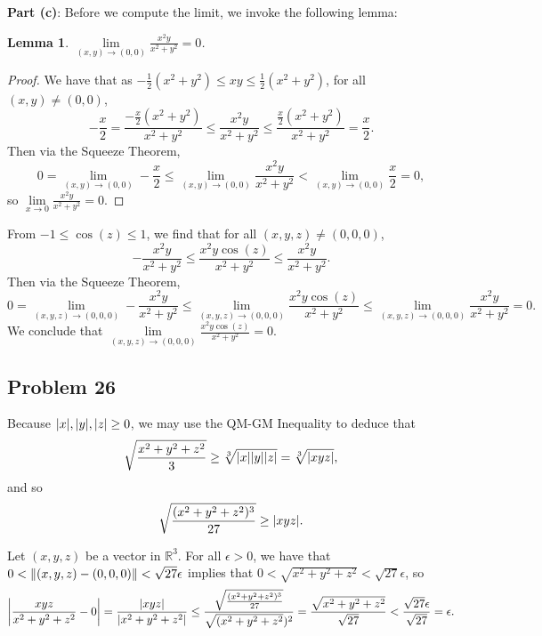 \documentclass[11pt]{article}
\newtheorem*{lemma*}{Lemma}
\begin{document}
\textbf{Part (c)}: Before we compute the limit, we invoke the following lemma:
\begin{adjustwidth}{1cm}{}
	\begin{lemma*}
		$\lim\limits_{(x, y) \to (0, 0)} \frac{x^{2}y}{x^{2} + y^{2}} = 0$.
	\end{lemma*}
    \begin{proof}\renewcommand{\qedsymbol}{}
		We have that as $-\tfrac{1}{2}(x^{2} + y^{2}) \le xy \le \tfrac{1}{2}(x^{2} + y^{2})$, for all $(x, y) \ne (0, 0)$,
		\[
			-\frac{x}{2} = \frac{-\tfrac{x}{2}(x^{2} + y^{2})}{x^{2} + y^{2}} \le \frac{x^{2}y}{x^{2} + y^{2}} \le \frac{\tfrac{x}{2}(x^{2} + y^{2})}{x^{2} + y^{2}} = \frac{x}{2}.
		\]
		Then via the Squeeze Theorem,
		\[
			0 = \lim\limits_{(x, y) \to (0, 0)} -\frac{x}{2} \le \lim\limits_{(x, y) \to (0, 0)} \frac{x^{2}y}{x^{2} + y^{2}} < \lim\limits_{(x, y) \to (0, 0)} \frac{x}{2} = 0,
		\]
		so $\lim\limits_{x \to 0} \tfrac{x^{2}y}{x^{2} + y^{2}} = 0$.
	\end{proof}
\end{adjustwidth}
From $-1 \le \cos(z) \le 1$, we find that for all $(x, y, z) \ne (0, 0, 0)$,
\[
	-\frac{x^{2}y}{x^{2} + y^{2}} \le \frac{x^{2}y\cos(z)}{x^{2} + y^{2}} \le \frac{x^{2}y}{x^{2} + y^{2}}.
\]
Then via the Squeeze Theorem,
\[
	0 = \lim\limits_{(x, y, z) \to (0, 0, 0)} -\frac{x^{2}y}{x^{2} + y^{2}} \le \lim\limits_{(x, y, z) \to (0, 0, 0)} \frac{x^{2}y\cos(z)}{x^{2} + y^{2}} \le \lim\limits_{(x, y, z) \to (0, 0, 0)} \frac{x^{2}y}{x^{2} + y^{2}} = 0.
\]
We conclude that $\lim\limits_{(x, y, z) \to (0, 0, 0)} \frac{x^{2}y \cos(z)}{x^{2} + y^{2}} = 0$.

\subsection{Problem 26}
Because $\abs{x}, \abs{y}, \abs{z} \ge 0$, we may use the QM-GM Inequality to deduce that 
\[
	\sqrt{\frac{x^{2} + y^{2} + z^{2}}{3}} \ge \sqrt[3]{\abs{x}\abs{y}\abs{z}} = \sqrt[3]{\abs{xyz}},
\]
and so 
\[
	\sqrt{\frac{(x^{2} + y^{2} + z^{2})^{3}}{27}} \ge \abs{xyz}.
\]

Let $(x, y, z)$ be a vector in $\mathbb{R}^{3}$. For all $\epsilon > 0$, we have that $0 < \norm{(x, y, z) - (0, 0, 0)} < \sqrt{27} \epsilon$ implies that $0 < \sqrt{x^{2} + y^{2} + z^{2}} < \sqrt{27} \epsilon$, so 
\[
	\abs{\frac{xyz}{x^{2} + y^{2} + z^{2}} - 0}	=	\frac{\abs{xyz}}{\abs{x^{2} + y^{2} + z^{2}}}	\le \frac{\sqrt{\frac{(x^{2} + y^{2} + z^{2})^{3}}{27}}}{\sqrt{(x^{2} + y^{2} + z^{2}})^{2}} 
	= \frac{\sqrt{x^{2} + y^{2} + z^{2}}}{\sqrt{27}} < \frac{\sqrt{27} \epsilon}{\sqrt{27}} = \epsilon.
\]
\end{document}
